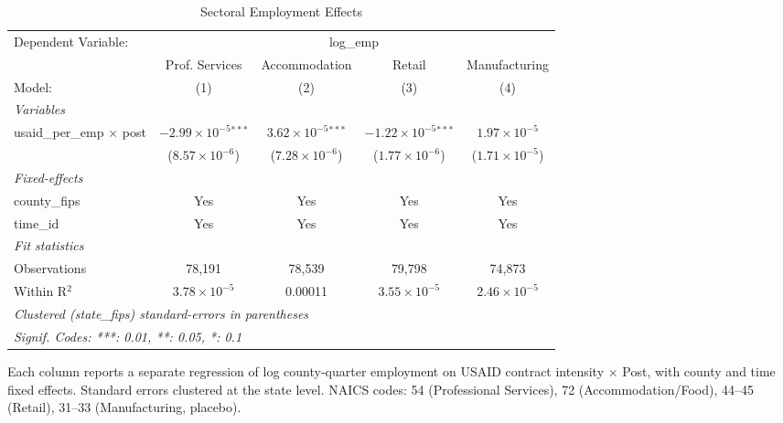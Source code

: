 
\begin{table}[htbp]
   \caption{\label{tab:sectors} Sectoral Employment Effects}
   \centering
   \begin{adjustbox}{max width=\textwidth}
   \begin{tabular}{lcccc}
      \tabularnewline \midrule \midrule
      Dependent Variable: & \multicolumn{4}{c}{log\_emp}\\
                                       & Prof. Services                 & Accommodation                 & Retail                         & Manufacturing \\   
      Model:                           & (1)                            & (2)                           & (3)                            & (4)\\  
      \midrule
      \emph{Variables}\\
      usaid\_per\_emp $\times$ post    & $-2.99\times 10^{-5}$$^{***}$  & $3.62\times 10^{-5}$$^{***}$  & $-1.22\times 10^{-5}$$^{***}$  & $1.97\times 10^{-5}$\\    
                                       & ($8.57\times 10^{-6}$)         & ($7.28\times 10^{-6}$)        & ($1.77\times 10^{-6}$)         & ($1.71\times 10^{-5}$)\\    
      \midrule
      \emph{Fixed-effects}\\
      county\_fips                     & Yes                            & Yes                           & Yes                            & Yes\\  
      time\_id                         & Yes                            & Yes                           & Yes                            & Yes\\  
      \midrule
      \emph{Fit statistics}\\
      Observations                     & 78,191                         & 78,539                        & 79,798                         & 74,873\\  
      Within R$^2$                     & $3.78\times 10^{-5}$           & 0.00011                       & $3.55\times 10^{-5}$           & $2.46\times 10^{-5}$\\   
      \midrule \midrule
      \multicolumn{5}{l}{\emph{Clustered (state\_fips) standard-errors in parentheses}}\\
      \multicolumn{5}{l}{\emph{Signif. Codes: ***: 0.01, **: 0.05, *: 0.1}}\\
   \end{tabular}
   \end{adjustbox}

   \par \raggedright 
   Each column reports a separate regression of log county-quarter employment on USAID contract intensity $\times$ Post, with county and time fixed effects. Standard errors clustered at the state level. NAICS codes: 54 (Professional Services), 72 (Accommodation/Food), 44--45 (Retail), 31--33 (Manufacturing, placebo).
\end{table}


